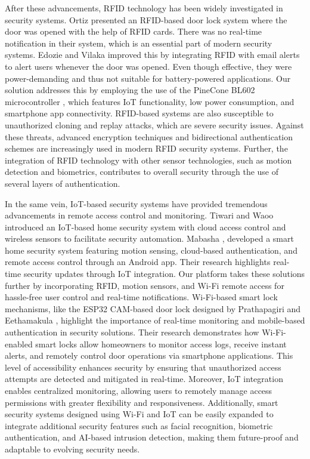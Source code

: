 \documentclass[a4paper]{scrartcl}
\begin{document}
After these advancements, RFID technology has been widely investigated in security systems. Ortiz \cite{Ortiz2021} presented an RFID-based door lock system where the door was opened with the help of RFID cards. There was no real-time notification in their system, which is an essential part of modern security systems. Edozie and Vilaka \cite{Edozie2020} improved this by integrating RFID with email alerts to alert users whenever the door was opened. Even though effective, they were power-demanding and thus not suitable for battery-powered applications. Our solution addresses this by employing the use of the PineCone BL602 microcontroller \cite{PINE64}, which features IoT functionality, low power consumption, and smartphone app connectivity. RFID-based systems are also susceptible to unauthorized cloning and replay attacks, which are severe security issues. Against these threats, advanced encryption techniques and bidirectional authentication schemes are increasingly used in modern RFID security systems. Further, the integration of RFID technology with other sensor technologies, such as motion detection and biometrics, contributes to overall security through the use of several layers of authentication.

    In the same vein, IoT-based security systems have provided tremendous advancements in remote access control and monitoring. Tiwari and Waoo \cite{Tiwari2024} introduced an IoT-based home security system with cloud access control and wireless sensors to facilitate security automation. Mabasha \cite{Mabasha2023}, developed a smart home security system featuring motion sensing, cloud-based authentication, and remote access control through an Android app. Their research highlights real-time security updates through IoT integration. Our platform takes these solutions further by incorporating RFID, motion sensors, and Wi-Fi remote access for hassle-free user control and real-time notifications. Wi-Fi-based smart lock mechanisms, like the ESP32 CAM-based door lock designed by Prathapagiri and Eethamakula \cite{Patel2021}, highlight the importance of real-time monitoring and mobile-based authentication in security solutions. Their research demonstrates how Wi-Fi-enabled smart locks allow homeowners to monitor access logs, receive instant alerts, and remotely control door operations via smartphone applications. This level of accessibility enhances security by ensuring that unauthorized access attempts are detected and mitigated in real-time. Moreover, IoT integration enables centralized monitoring, allowing users to remotely manage access permissions with greater flexibility and responsiveness. Additionally, smart security systems designed using Wi-Fi and IoT can be easily expanded to integrate additional security features such as facial recognition, biometric authentication, and AI-based intrusion detection, making them future-proof and adaptable to evolving security needs.
\end{document}
